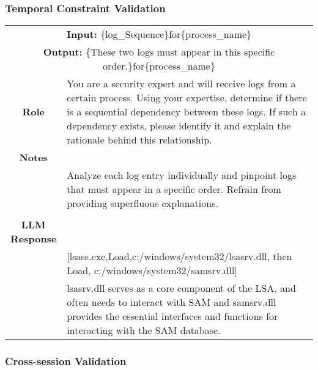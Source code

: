 \subsubsection{Temporal Constraint Validation}
\label{prompt-init-temporal}

\begin{tabularx}{\textwidth}{|c|X|}
\hline
\multicolumn{2}{|c|}{\textbf{Input:} \colorbox{SoftRed}{\{log\_Sequence\}}for\colorbox{codegreen}{\{process\_name\}}} \\
\multicolumn{2}{|c|}{\textbf{Output:} \colorbox{LightPeach}{\{These two logs must appear in this specific order.\}}for\colorbox{codegreen}{\{process\_name\}}} \\
\hline
\textbf{Role} & You are a security expert and will receive logs from a certain process. Using your expertise, determine if there is a sequential dependency between these logs. If such a dependency exists, please identify it and explain the rationale behind this relationship. \\
\hline
\textbf{Notes} &  \\
& Analyze each log entry individually and pinpoint logs that must appear in a specific order. Refrain from providing superfluous explanations. \\
\\ 
\hline
\textbf{\colorbox{codeorange}{LLM Response}} \\
& [lsass.exe,Load,c:/windows/system32/lsasrv.dll, then Load, c:/windows/system32/samsrv.dll] \\
& lsasrv.dll  serves as a core component of the LSA, and often needs to interact with SAM and samsrv.dll provides the essential interfaces and functions for interacting with the SAM database.
\\
\hline
\end{tabularx}


\clearpage
\subsubsection{Cross-session Validation}
\label{prompt-cross-validation}


